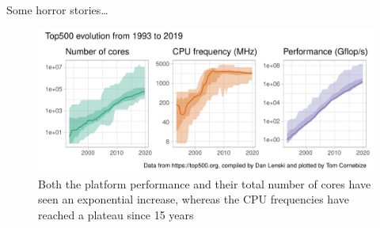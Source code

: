 \label{chapter:introduction}

\lipsum[1]

\label{chapter:context}

Some horror stories\cite{Petrini_2003}\dots
    \begin{figure}[htbp]
        \centering
        \includegraphics[width=\textwidth]{img/context/top500.pdf}
        \caption{\label{fig:context:top500}
        Both the platform performance and their total number of cores have seen an exponential increase, whereas the CPU
        frequencies have reached a plateau since 15 years}
    \end{figure}

\lipsum[1]
